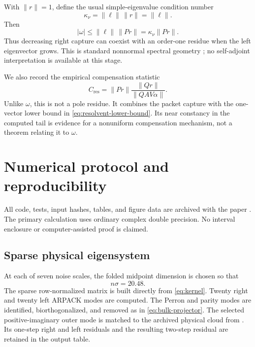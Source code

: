 \documentclass[11pt]{article}
\theoremstyle{definition}
\theoremstyle{remark}
\begin{document}
With $\|r\|=1$, define the usual simple-eigenvalue condition number
\begin{equation}
\label{eq:eigenvalue-condition}
 \kappa_\nu=\|\ell\|\,\|r\|=\|\ell\|.
\end{equation}
Then
\begin{equation}
\label{eq:weight-upper-bound}
 |\omega|\le\|\ell\|\,\|Pr\|=\kappa_\nu\|Pr\|.
\end{equation}
Thus decreasing right capture can coexist with an order-one residue when
the left eigenvector grows.  This is standard nonnormal spectral geometry
\citep{Kato1995,StewartSun1990,TrefethenEmbree2005}; no self-adjoint
interpretation is available at this stage.

We also record the empirical compensation statistic
\begin{equation}
\label{eq:compensation}
 C_{\mathrm{res}}=\|Pr\|
 \frac{\|Qr\|}{\|QAV\alpha\|}.
\end{equation}
Unlike $\omega$, this is not a pole residue.  It combines the packet capture
with the one-vector lower bound in \eqref{eq:resolvent-lower-bound}.  Its
near constancy in the computed tail is evidence for a nonuniform
compensation mechanism, not a theorem relating it to $\omega$.

\section{Numerical protocol and reproducibility}
\label{sec:numerics}

All code, tests, input hashes, tables, and figure data are archived with the
paper \citep{WangPhysicalFeshbachCode2026}.  The primary calculation uses
ordinary complex double precision.  No interval enclosure or
computer-assisted proof is claimed.

\subsection{Sparse physical eigensystem}

At each of seven noise scales, the folded midpoint dimension is chosen so
that
\begin{equation}
\label{eq:resolution-density}
 n\sigma=20.48.
\end{equation}
The sparse row-normalized matrix is built directly from
\eqref{eq:kernel}.  Twenty right and twenty left ARPACK modes are computed.
The Perron and parity modes are identified, biorthogonalized, and removed as
in \eqref{eq:bulk-projector}.  The selected positive-imaginary outer mode is
matched to the archived physical cloud from
\citep{WangBulkScattering2026}.  Its one-step right and left residuals and
the resulting two-step residual are retained in the output table.
\end{document}
